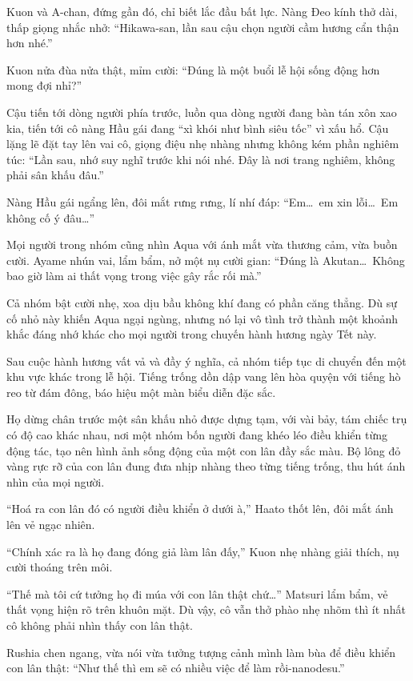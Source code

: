 \documentclass[../main.tex]{subfiles}
\begin{document}
Kuon và A-chan, đứng gần đó, chỉ biết lắc đầu bất lực. Nàng Đeo kính thở dài, thấp giọng nhắc nhở: ``Hikawa-san, lần sau cậu chọn người cầm hương cẩn thận hơn nhé.''

Kuon nửa đùa nửa thật, mỉm cười: ``Đúng là một buổi lễ hội sống động hơn mong đợi nhỉ?''

Cậu tiến tới dòng người phía trước, luồn qua dòng người đang bàn tán xôn xao kia, tiến tới cô nàng Hầu gái đang ``xì khói như bình siêu tốc'' vì xấu hổ. Cậu lặng lẽ đặt tay lên vai cô, giọng điệu nhẹ nhàng nhưng không kém phần nghiêm túc: ``Lần sau, nhớ suy nghĩ trước khi nói nhé. Đây là nơi trang nghiêm, không phải sân khấu đâu.''

Nàng Hầu gái ngẩng lên, đôi mắt rưng rưng, lí nhí đáp: ``Em\dots\ em xin lỗi\dots\ Em không cố ý đâu\dots''

Mọi người trong nhóm cũng nhìn Aqua với ánh mắt vừa thương cảm, vừa buồn cười. Ayame nhún vai, lẩm bẩm, nở một nụ cười gian: ``Đúng là Akutan\dots\ Không bao giờ làm ai thất vọng trong việc gây rắc rối mà.''

Cả nhóm bật cười nhẹ, xoa dịu bầu không khí đang có phần căng thẳng. Dù sự cố nhỏ này khiến Aqua ngại ngùng, nhưng nó lại vô tình trở thành một khoảnh khắc đáng nhớ khác cho mọi người trong chuyến hành hương ngày Tết này.

\ct

Sau cuộc hành hương vất vả và đầy ý nghĩa, cả nhóm tiếp tục di chuyển đến một khu vực khác trong lễ hội. Tiếng trống dồn dập vang lên hòa quyện với tiếng hò reo từ đám đông, báo hiệu một màn biểu diễn đặc sắc.

Họ dừng chân trước một sân khấu nhỏ được dựng tạm, với vài bảy, tám chiếc trụ có độ cao khác nhau, nơi một nhóm bốn người đang khéo léo điều khiển từng động tác, tạo nên hình ảnh sống động của một con lân đầy sắc màu. Bộ lông đỏ vàng rực rỡ của con lân đung đưa nhịp nhàng theo từng tiếng trống, thu hút ánh nhìn của mọi người.

``Hoá ra con lân đó có người điều khiển ở dưới à,'' Haato thốt lên, đôi mắt ánh lên vẻ ngạc nhiên.

``Chính xác ra là họ đang đóng giả làm lân đấy,'' Kuon nhẹ nhàng giải thích, nụ cười thoáng trên môi.

``Thế mà tôi cứ tưởng họ đi múa với con lân thật chứ\dots'' Matsuri lẩm bẩm, vẻ thất vọng hiện rõ trên khuôn mặt. Dù vậy, cô vẫn thở phào nhẹ nhõm thì ít nhất cô không phải nhìn thấy con lân thật.

Rushia chen ngang, vừa nói vừa tưởng tượng cảnh mình làm bùa để điều khiển con lân thật: ``Như thế thì em sẽ có nhiều việc để làm rồi-nanodesu.''
\end{document}
